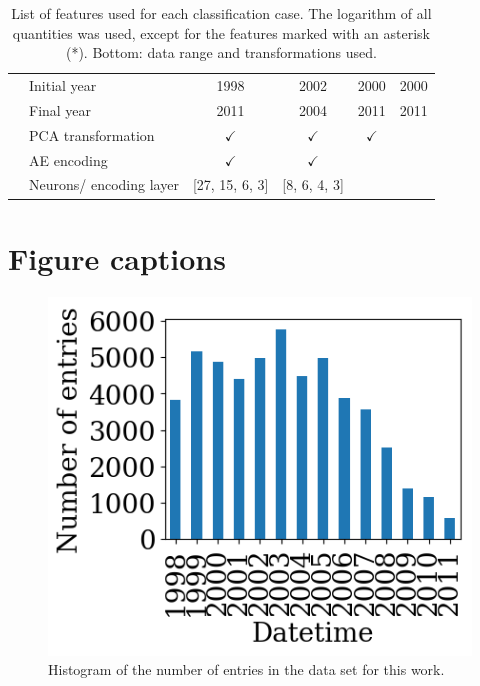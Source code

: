 \documentclass[utf8]{frontiersSCNS} %
\begin{document}
\begin{table}
\begin{tabular}{@{}rlcccc@{}}
		\midrule
		 & Initial year & 1998 & 2002 & 2000 & 2000 \\
		 & Final year & 2011 & 2004 & 2011 & 2011 \\
		 & PCA transformation & $\checkmark$ & $\checkmark$ & $\checkmark$ &  \\
		 & AE encoding & $\checkmark$ & $\checkmark$ & & \\
		 & Neurons/ encoding layer & [27, 15, 6, 3] & [8, 6, 4, 3] & & \\
		\bottomrule
	\end{tabular}
	\caption{List of features used for each classification case. The logarithm of all quantities was used, except for the features marked with an asterisk (*). Bottom: data range and transformations used.}
	\label{tab:features}
\end{table}

\section*{Figure captions}



\begin{figure}[h!]
	\begin{center}
		\includegraphics[width=.5\textwidth]{Amaya/datacoverage}
	\end{center}
	\caption{Histogram of the number of entries in the data set for this work.}\label{fig:datacoverage}
\end{figure}
\end{document}
